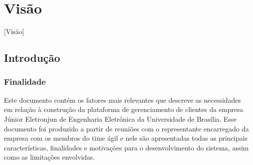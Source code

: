 \chapter{Visão}[Visão]
  \section{Introdução}
    \subsection{Finalidade}
    Este documento contém os fatores mais relevantes que descreve as necessidades em relação à construção da plataforma de gerenciamento de clientes da empresa Júnior Eletronjun de Engenharia Eletrônica da Universidade de Brasília. Esse documento foi produzido a partir de reuniões com o representante encarregado da empresa com os membros do time ágil e nele são apresentadas todas as principais características, finalidades e motivações para o desenvolvimento do sistema, assim como as limitações envolvidas. 
